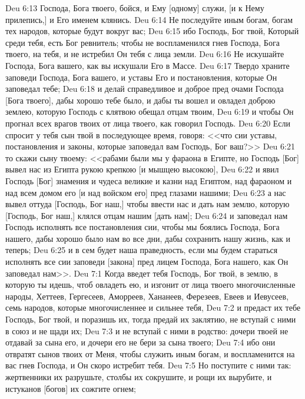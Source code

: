 \rsbpar\vs Deu 6:13 Господа, Бога твоего, бойся, и Ему [одному] служи, [и к Нему прилепись,] и Его именем клянись.
\vs Deu 6:14 Не последуйте иным богам, богам тех народов, которые будут вокруг вас;
\vs Deu 6:15 ибо Господь, Бог твой, Который среди тебя, есть Бог ревнитель; чтобы не воспламенился гнев Господа, Бога твоего, на тебя, и не истребил Он тебя с лица земли.
\rsbpar\vs Deu 6:16 Не искушайте Господа, Бога вашего, как вы искушали Его в Массе.
\rsbpar\vs Deu 6:17 Твердо храните заповеди Господа, Бога вашего, и уставы Его и постановления, которые Он заповедал тебе;
\vs Deu 6:18 и делай справедливое и доброе пред очами Господа [Бога твоего], дабы хорошо тебе было, и дабы ты вошел и овладел доброю землею, которую Господь с клятвою обещал отцам твоим,
\vs Deu 6:19 и чтобы Он прогнал всех врагов твоих от лица твоего, как говорил Господь.
\vs Deu 6:20 Если спросит у тебя сын твой в последующее время, говоря: <<что  сии уставы, постановления и законы, которые заповедал вам Господь, Бог ваш?>>
\vs Deu 6:21 то скажи сыну твоему: <<рабами были мы у фараона в Египте, но Господь [Бог] вывел нас из Египта рукою крепкою [и мышцею высокою],
\vs Deu 6:22 и явил Господь [Бог] знамения и чудеса великие и казни над Египтом, над фараоном и над всем домом его [и над войском его] пред глазами нашими;
\vs Deu 6:23 а нас вывел оттуда [Господь, Бог наш,] чтобы ввести нас и дать нам землю, которую [Господь, Бог наш,] клялся отцам нашим [дать нам];
\vs Deu 6:24 и заповедал нам Господь исполнять все постановления сии, чтобы мы боялись Господа, Бога нашего, дабы хорошо было нам во все дни, дабы сохранить нашу жизнь, как и теперь;
\vs Deu 6:25 и в сем будет наша праведность, если мы будем стараться исполнять все сии заповеди [закона] пред лицем Господа, Бога нашего, как Он заповедал нам>>.
\vs Deu 7:1 Когда введет тебя Господь, Бог твой, в землю, в которую ты идешь, чтоб овладеть ею, и изгонит от лица твоего многочисленные народы, Хеттеев, Гергесеев, Аморреев, Хананеев, Ферезеев, Евеев и Иевусеев, семь народов, которые многочисленнее и сильнее тебя,
\vs Deu 7:2 и предаст их тебе Господь, Бог твой, и поразишь их, тогда предай их заклятию, не вступай с ними в союз и не щади их;
\vs Deu 7:3 и не вступай с ними в родство: дочери твоей не отдавай за сына его, и дочери его не бери за сына твоего;
\vs Deu 7:4 ибо они отвратят сынов твоих от Меня, чтобы служить иным богам, и  воспламенится на вас гнев Господа, и Он скоро истребит тебя.
\vs Deu 7:5 Но поступите с ними так: жертвенники их разрушьте, столбы их сокрушите, и рощи их вырубите, и истуканов [богов] их сожгите огнем;
